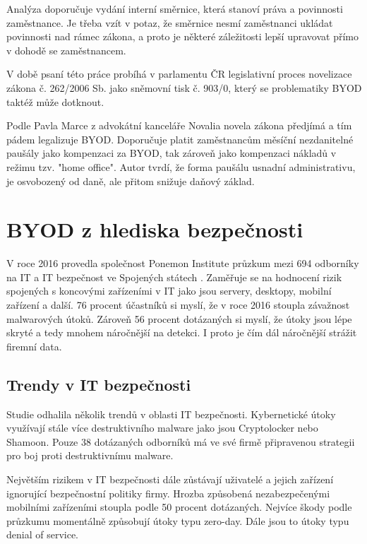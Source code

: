Analýza \cite{pravniProstor} doporučuje vydání interní směrnice, která stanoví práva a povinnosti zaměstnance. Je třeba vzít v potaz, že směrnice nesmí zaměstnanci ukládat povinnosti nad rámec zákona, a proto je některé záležitosti lepší upravovat přímo v dohodě se zaměstnancem.

V době psaní této práce probíhá v parlamentu ČR legislativní proces novelizace zákona č. 262/2006 Sb. jako sněmovní tisk č. 903/0, který se problematiky BYOD taktéž může dotknout.

Podle Pavla Marce z advokátní kanceláře Novalia \cite{HomeOffice} novela zákona předjímá a tím pádem legalizuje BYOD. Doporučuje platit zaměstnancům měsíční nezdanitelné paušály jako kompenzaci za BYOD, tak zároveň jako kompenzaci nákladů v režimu tzv. "home office". Autor tvrdí, že forma paušálu usnadní administrativu, je osvobozený od daně, ale přitom snižuje daňový základ. 

\section{BYOD z hlediska bezpečnosti}

V roce 2016 provedla společnost Ponemon Institute průzkum mezi 694 odborníky na IT a IT bezpečnost ve Spojených státech \cite{ponemon}. Zaměřuje se na hodnocení rizik spojených s koncovými zařízeními v IT jako jsou servery, desktopy, mobilní zařízení a další. 76 procent účastníků si myslí, že v roce 2016 stoupla závažnost malwarových útoků. Zároveň 56 procent dotázaných si myslí, že útoky jsou lépe skryté a tedy mnohem náročnější na detekci. I proto je čím dál náročnější strážit firemní data.


\subsection{Trendy v IT bezpečnosti}

Studie \cite{ponemon} odhalila několik trendů v oblasti IT bezpečnosti. Kybernetické útoky využívají stále více destruktivního malware jako jsou Cryptolocker nebo Shamoon. Pouze 38 dotázaných odborníků má ve své firmě připravenou strategii pro boj proti destruktivnímu malware.

Největším rizikem v IT bezpečnosti dále zůstávají uživatelé a jejich zařízení ignorující bezpečnostní politiky firmy. Hrozba způsobená nezabezpečenými mobilními zařízeními stoupla podle 50 procent dotázaných. Nejvíce škody podle průzkumu momentálně způsobují útoky typu zero-day. Dále jsou to útoky typu denial of service.

